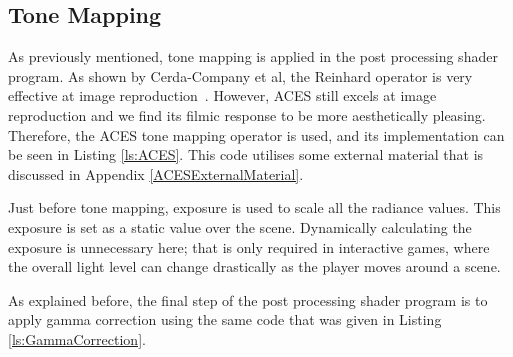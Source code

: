 
\subsection{Tone Mapping} \label{ToneMappingImplementation}

As previously mentioned, tone mapping is applied in the post processing shader program. As shown by Cerda-Company et al, the Reinhard operator is very effective at image reproduction~\cite{ComparingToneMappingOperators}. However, ACES still excels at image reproduction and we find its filmic response to be more aesthetically pleasing. Therefore, the ACES tone mapping operator is used, and its implementation can be seen in Listing \ref{ls:ACES}. This code utilises some external material that is discussed in Appendix \ref{ACESExternalMaterial}.

Just before tone mapping, exposure is used to scale all the radiance values. This exposure is set as a static value over the scene. Dynamically calculating the exposure is unnecessary here; that is only required in interactive games, where the overall light level can change drastically as the player moves around a scene.

As explained before, the final step of the post processing shader program is to apply gamma correction using the same code that was given in Listing \ref{ls:GammaCorrection}.

